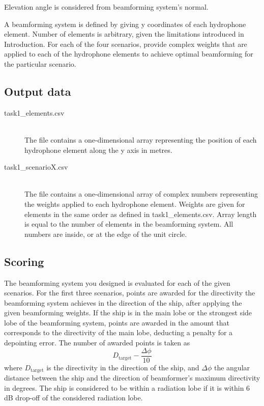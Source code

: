 \documentclass{article}[a4paper]
\begin{document}
Elevation angle is considered from beamforming system's normal.

A beamforming system is defined by giving y coordinates of each hydrophone element. Number of elements is arbitrary, given the limitations introduced in Introduction. For each of the four scenarios, provide complex weights that are applied to each of the hydrophone elements to achieve optimal beamforming for the particular scenario.

\subsection*{Output data}

\begin{description}
	\item[task1\_elements.csv] \,\\ The file contains a one-dimensional array representing the position of each hydrophone element along the y axis in metres.
	\item[task1\_scenarioX.csv] \,\\ The file contains a one-dimensional array of complex numbers representing the weights applied to each hydrophone element. Weights are given for elements in the same order as defined in task1\_elements.csv. Array length is equal to the number of elements in the beamforming system. All numbers are inside, or at the edge of the unit circle.
\end{description}

\subsection*{Scoring}

The beamforming system you designed is evaluated for each of the given scenarios. For the first three scenarios, points are awarded for the directivity the beamforming system achieves in the direction of the ship, after applying the given beamforming weights. If the ship is in the main lobe or the strongest side lobe of the beamforming system, points are awarded in the amount that corresponds to the directivity of the main lobe, deducting a penalty for a depointing error. The number of awarded points is taken as
\[ D_\textrm{target} - \dfrac{\varDelta \phi}{10} \]
where $D_\textrm{target}$ is the directivity in the direction of the ship, and $\varDelta \phi$ the angular distance between the ship and the direction of beamformer's maximum directivity in degrees. The ship is considered to be within a radiation lobe if it is within 6 dB drop-off of the considered radiation lobe.
\end{document}
